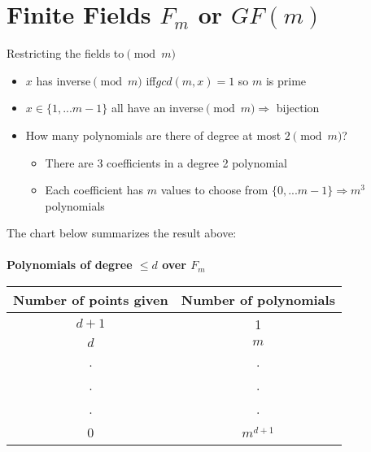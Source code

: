 \documentclass[a4paper]{article}
\begin{document}
\section{Finite Fields $F_m$ or $GF(m)$}
Restricting the fields to$\pmod m$
\begin{itemize}
    \item $x$ has inverse$\pmod m$ iff$gcd(m,x) = 1$ so $m$ is prime
    \item $x \in \{1,... m-1\}$ all have an inverse$\pmod m \Rightarrow $ bijection
    \item How many polynomials are there of degree at most $2 \pmod m$?
    \begin{itemize}
        \item There are $3$ coefficients in a degree 2 polynomial
        \item Each coefficient has $m$ values to choose from $\{0, ...m-1\} \Rightarrow m^3$ polynomials
    \end{itemize}
\end{itemize}
The chart below summarizes the result above:\\\\
\centering
\textbf{Polynomials of degree $\leq d$ over $F_m$}
    \begin{table}[htbp]
    \centering
    \begin{tabular}[t]{|c|c|}
        \hline
        Number of points given & Number of polynomials\\ \hline
        $d+1$ & 1\\ \hline
        $d$ & $m$\\ \hline
        . & .\\ 
        . & .\\
        . & .\\ \hline
        0 & $m^{d+1}$\\ \hline
    \end{tabular}
    \end{table}
\end{document}
